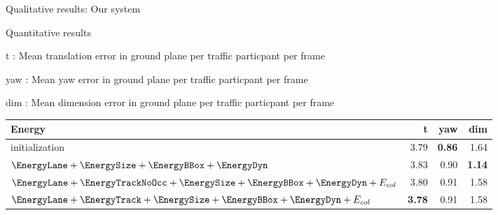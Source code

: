 \begin{frame}{Qualitative results: Our system}
  \centering
\end{frame}

\begin{frame}{Quantitative results}
  \small{
    t : Mean translation error in ground plane per traffic particpant per frame

    yaw : Mean yaw error in ground plane per traffic particpant per frame

    dim : Mean dimension error in ground plane per traffic particpant per frame

\begin{table}
  \begin{tabular}{lrrr}
    \toprule
    Energy & t & yaw & dim \\
    \midrule
    initialization                                                                                  & 3.79 & \textbf{0.86} & 1.64 \\
    $\EnergyLane+\EnergySize+\EnergyBBox+\EnergyDyn                                       $ & 3.83 & 0.90 & \textbf{1.14} \\
    $\EnergyLane+\EnergyTrackNoOcc+\EnergySize+\EnergyBBox+\EnergyDyn+\EnergyCol $ & 3.80 & 0.91 & 1.58 \\
    $\EnergyLane+\EnergyTrack+\EnergySize+\EnergyBBox+\EnergyDyn+\EnergyCol   $ & \textbf{3.78} & 0.91 & 1.58 \\
    \bottomrule
  \end{tabular}
\end{table}
  }

\end{frame}

